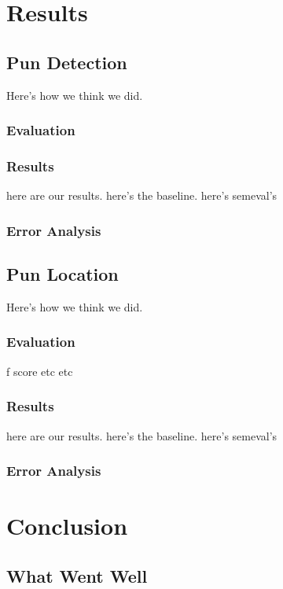 \documentclass{article}
\begin{document}
\section{Results}
\label{results}

\subsection{Pun Detection}
Here's how we think we did.
\subsubsection{Evaluation}
\subsubsection{Results}
here are our results. here's the baseline. here's semeval's

\subsubsection{Error Analysis}

\subsection{Pun Location}
Here's how we think we did.
\subsubsection{Evaluation}
f score etc etc
\subsubsection{Results}
here are our results. here's the baseline. here's semeval's
\subsubsection{Error Analysis}


\section{Conclusion}
\label{conclusion}

\subsection{What Went Well}
\end{document}
